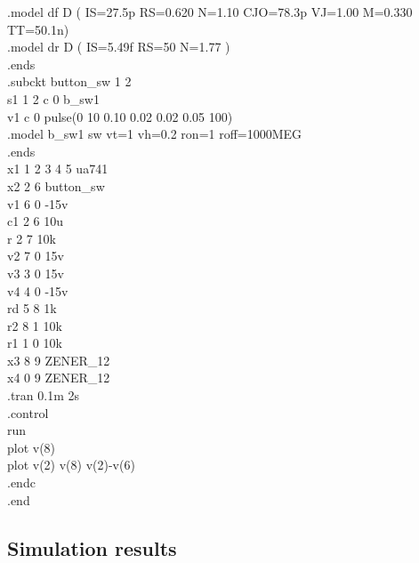 \documentclass[12pt]{article}
\begin{document}
.model df D ( IS=27.5p RS=0.620 N=1.10 CJO=78.3p VJ=1.00 M=0.330 TT=50.1n)\\
.model dr D ( IS=5.49f RS=50 N=1.77 )\\
.ends\\
.subckt button\_sw 1 2\\
s1 1 2 c 0 b\_sw1\\
v1 c 0 pulse(0 10 0.10 0.02 0.02 0.05 100)\\
.model b\_sw1 sw vt=1 vh=0.2 ron=1 roff=1000MEG\\
.ends\\
\newpage
x1 1 2 3 4 5 ua741\\
x2 2 6 button_sw\\
v1 6 0 -15v\\
c1 2 6 10u\\
r 2 7 10k\\
v2 7 0 15v\\
v3 3 0 15v\\
v4 4 0 -15v\\
rd 5 8 1k\\
r2 8 1 10k\\
r1 1 0 10k\\
x3 8 9 ZENER\_12\\
x4 0 9 ZENER\_12\\
.tran 0.1m 2s\\
.control\\
run\\
plot v(8)\\
plot v(2) v(8) v(2)-v(6)\\
.endc\\
.end\\
\newpage


\subsection{Simulation results}
\end{document}
